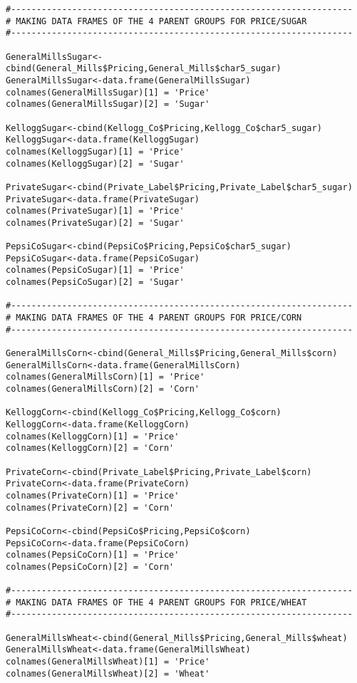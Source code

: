 \documentclass[12pt,english]{article}
\begin{document}
\begin{lstlisting}
#-------------------------------------------------------------------
# MAKING DATA FRAMES OF THE 4 PARENT GROUPS FOR PRICE/SUGAR
#-------------------------------------------------------------------

GeneralMillsSugar<-cbind(General_Mills$Pricing,General_Mills$char5_sugar)
GeneralMillsSugar<-data.frame(GeneralMillsSugar)
colnames(GeneralMillsSugar)[1] = 'Price'
colnames(GeneralMillsSugar)[2] = 'Sugar'

KelloggSugar<-cbind(Kellogg_Co$Pricing,Kellogg_Co$char5_sugar)
KelloggSugar<-data.frame(KelloggSugar)
colnames(KelloggSugar)[1] = 'Price'
colnames(KelloggSugar)[2] = 'Sugar'

PrivateSugar<-cbind(Private_Label$Pricing,Private_Label$char5_sugar)
PrivateSugar<-data.frame(PrivateSugar)
colnames(PrivateSugar)[1] = 'Price'
colnames(PrivateSugar)[2] = 'Sugar'

PepsiCoSugar<-cbind(PepsiCo$Pricing,PepsiCo$char5_sugar)
PepsiCoSugar<-data.frame(PepsiCoSugar)
colnames(PepsiCoSugar)[1] = 'Price'
colnames(PepsiCoSugar)[2] = 'Sugar'

#-------------------------------------------------------------------
# MAKING DATA FRAMES OF THE 4 PARENT GROUPS FOR PRICE/CORN
#-------------------------------------------------------------------

GeneralMillsCorn<-cbind(General_Mills$Pricing,General_Mills$corn)
GeneralMillsCorn<-data.frame(GeneralMillsCorn)
colnames(GeneralMillsCorn)[1] = 'Price'
colnames(GeneralMillsCorn)[2] = 'Corn'

KelloggCorn<-cbind(Kellogg_Co$Pricing,Kellogg_Co$corn)
KelloggCorn<-data.frame(KelloggCorn)
colnames(KelloggCorn)[1] = 'Price'
colnames(KelloggCorn)[2] = 'Corn'

PrivateCorn<-cbind(Private_Label$Pricing,Private_Label$corn)
PrivateCorn<-data.frame(PrivateCorn)
colnames(PrivateCorn)[1] = 'Price'
colnames(PrivateCorn)[2] = 'Corn'

PepsiCoCorn<-cbind(PepsiCo$Pricing,PepsiCo$corn)
PepsiCoCorn<-data.frame(PepsiCoCorn)
colnames(PepsiCoCorn)[1] = 'Price'
colnames(PepsiCoCorn)[2] = 'Corn'

#-------------------------------------------------------------------
# MAKING DATA FRAMES OF THE 4 PARENT GROUPS FOR PRICE/WHEAT
#-------------------------------------------------------------------

GeneralMillsWheat<-cbind(General_Mills$Pricing,General_Mills$wheat)
GeneralMillsWheat<-data.frame(GeneralMillsWheat)
colnames(GeneralMillsWheat)[1] = 'Price'
colnames(GeneralMillsWheat)[2] = 'Wheat'


\end{lstlisting}
\end{document}
